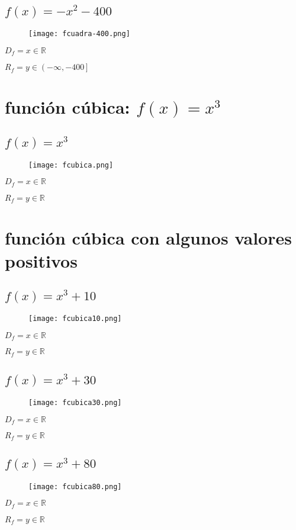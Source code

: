 \documentclass[12pt]{article}
\begin{document}
\subsection{$f(x) = -x^2 - 400$}
\begin{figure}[htb] \centering \texttt{[image: fcuadra-400.png]} 
\end{figure}
$D_f = x \in \mathbb{R}$ \par
$R_f = y \in \left(-\infty,-400\right]$
\newpage
\section{función {\cyan cúbica}: $f(x) = x^3$}
\subsection{$f(x) = x^3$}
\begin{figure}[htb] \centering \texttt{[image: fcubica.png]} 
\end{figure}
$D_f = x \in \mathbb{R}$ \par
$R_f = y \in \mathbb{R}$
\section{función {\cyan cúbica} con algunos {\cyan valores positivos}}
\subsection{$f(x) = x^3 + 10$}
\begin{figure}[htb] \centering \texttt{[image: fcubica10.png]} 
\end{figure}
$D_f = x \in \mathbb{R}$ \par
$R_f = y \in \mathbb{R}$
\subsection{$f(x) = x^3 + 30$}
\begin{figure}[htb] \centering \texttt{[image: fcubica30.png]} 
\end{figure}
$D_f = x \in \mathbb{R}$ \par
$R_f = y \in \mathbb{R}$
\subsection{$f(x) = x^3 + 80$}
\begin{figure}[htb] \centering \texttt{[image: fcubica80.png]} 
\end{figure}
$D_f = x \in \mathbb{R}$ \par
$R_f = y \in \mathbb{R}$
\newpage
\end{document}
